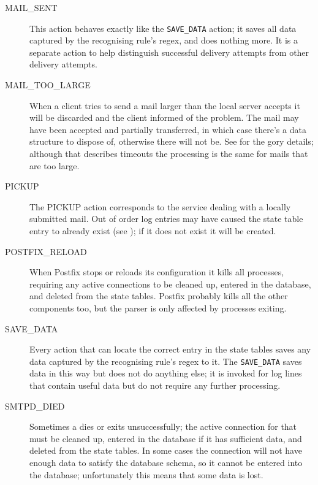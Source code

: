 \begin{description}
    \item [MAIL\_SENT] This action behaves exactly like the
        \texttt{SAVE\_DATA} action; it saves all data captured by the
        recognising rule's regex, and does nothing more.  It is a separate
        action to help distinguish successful delivery attempts from other
        delivery attempts.

    \item [MAIL\_TOO\_LARGE] When a client tries to send a mail larger than
        the local server accepts it will be discarded and the client
        informed of the problem.  The mail may have been accepted and
        partially transferred, in which case there's a data structure to
        dispose of, otherwise there will not be.  See  for the gory details; although that describes
        timeouts the processing is the same for mails that are too large.

    \item [PICKUP] The PICKUP action corresponds to the 
        service dealing with a locally submitted mail.  Out of order log
        entries may have caused the state table entry to already exist (see
        ); if it does not exist it
        will be created.

    \item [POSTFIX\_RELOAD] When Postfix stops or reloads its configuration
        it kills all  processes, requiring any active
        connections to be cleaned up, entered in the database, and deleted
        from the state tables.  Postfix probably kills all the other
        components too, but the parser is only affected by 
        processes exiting.

    \item [SAVE\_DATA] Every action that can locate the correct entry in
        the state tables saves any data captured by the recognising rule's
        regex to it.  The \texttt{SAVE\_DATA} saves data in this way but
        does not do anything else; it is invoked for log lines that contain
        useful data but do not require any further processing.

    \item [SMTPD\_DIED] Sometimes a  dies or exits
        unsuccessfully; the active connection for that  must
        be cleaned up, entered in the database if it has sufficient data,
        and deleted from the state tables.  In some cases the connection
        will not have enough data to satisfy the database schema, so it
        cannot be entered into the database; unfortunately this means that
        some data is lost.


\end{description}
